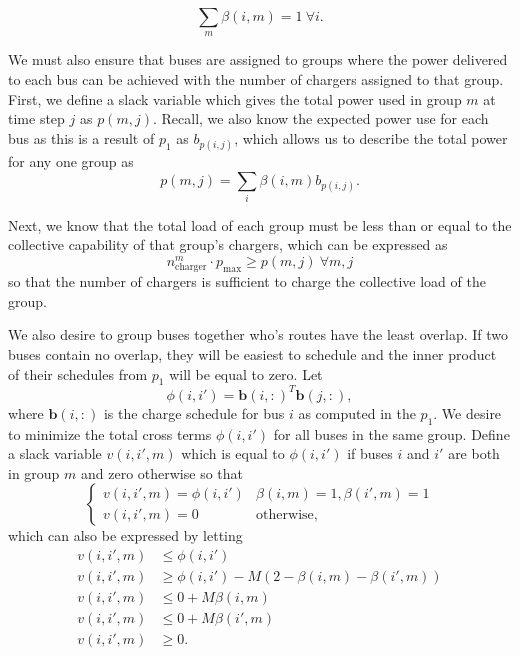 \begin{equation}\label{eqn:groups:groupId}
	\sum_m\beta(i,m) = 1 \ \forall i.
\end{equation}
\par We must also ensure that buses are assigned to groups where the power delivered to each bus can be achieved with the number of chargers assigned to that group. First, we define a slack variable which gives the total power used in group $m$ at time step $j$ as $p(m,j)$. Recall, we also know the expected power use for each bus as this is a result of $p_1$ as $b_{p(i,j)}$, which allows us to describe the total power for any one group as
\begin{equation}\label{eqn:groups:groupPower}
 p(m,j) = \sum_i\beta(i,m)b_{p(i,j)}.
\end{equation}
\par Next, we know that the total load of each group must be less than or equal to the collective capability of that group's chargers, which can be expressed as
\begin{equation}\label{eqn:groups:chargeLimit}
	n^m_{\text{charger}}\cdot p_{\text{max}} \ge p(m,j) \ \forall m,j
\end{equation}
so that the number of chargers is sufficient to charge the collective load of the group. 
\par We also desire to group buses together who's routes have the least overlap. If two buses contain no overlap, they will be easiest to schedule and the inner product of their schedules from $p_1$ will be equal to zero. Let 
\begin{equation*}
\phi(i,i') = \mathbf{b}(i,:)^T\mathbf{b}(j,:),
\end{equation*}
where $\mathbf{b}(i,:)$ is the charge schedule for bus $i$ as computed in the $p_1$. We desire to minimize the total cross terms $\phi(i,i')$ for all buses in the same group.  Define a slack variable $v(i,i',m)$ which is equal to $\phi(i,i')$ if buses $i$ and $i'$ are both in group $m$ and zero otherwise so that
\begin{equation*}
	\begin{cases}
		v(i,i',m) = \phi(i,i') & \beta(i,m) = 1, \beta(i',m) = 1 \\
		v(i,i',m) = 0 & \text{otherwise},
	\end{cases}
\end{equation*}
which can also be expressed by letting
\begin{equation}\label{eqn:groups:innerProd}\begin{aligned}
	v(i,i',m) &\le \phi(i,i') \\
	v(i,i',m) &\ge \phi(i,i') - M\left (2 - \beta(i,m) - \beta(i',m)\right ) \\
	v(i,i',m) &\le 0 + M\beta(i,m) \\
	v(i,i',m) &\le 0 + M\beta(i',m) \\
	v(i,i',m) &\ge 0.
\end{aligned}\end{equation}
